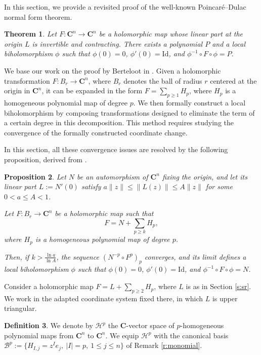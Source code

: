 \documentclass[english,11pt]{amsart}
\newtheorem{theorem}{Theorem}[section]
\newtheorem{proposition}[theorem]{Proposition}
\theoremstyle{definition}
\newtheorem{definition}[theorem]{Definition}
\theoremstyle{remark}
\numberwithin{equation}{section}
\newcommand{\C}{\mathbf{C}}
\begin{document}
In this section, we provide a revisited proof of the well-known Poincar\'e--Dulac normal form theorem.
\begin{theorem}\label{t:PD0}
    Let $F : \C^n \to \C^n$ be a holomorphic map whose linear part at the origin $L$ is invertible and contracting. There exists a polynomial $P$ and a local biholomorphism $\phi$ such that $\phi(0) = 0$, $\phi'(0) = \text{Id}$, and $\phi^{-1} \circ F \circ \phi = P$.
\end{theorem}

We base our work on the proof by Berteloot in \cite{Berteloot}. Given a holomorphic transformation $F : B_r \to \C^n$, where $B_r$ denotes the ball of radius $r$ centered at the origin in $\C^n$, it can be expanded in the form $F = \sum_{p \geq 1} H_p$, where $H_p$ is a homogeneous polynomial map of degree $p$. We then formally construct a local biholomorphism by composing transformations designed to eliminate the term of a certain degree in this decomposition. This method requires studying the convergence of the formally constructed coordinate change.

In this section, all these convergence issues are resolved by the following proposition, derived from \cite{Berteloot}.
\begin{proposition}\label{p:conv}
Let $N$ be an automorphism of $\C^n$ fixing the origin, and let its linear part $L := N'(0)$ satisfy $a \|z\| \leq \|L(z)\| \leq A \|z\|$ for some $0 < a \leq A < 1$.

Let $F : B_r \to \C^n$ be a holomorphic map such that
\[
F = N + \sum_{p \geq k} H_p,
\]
where $H_p$ is a homogeneous polynomial map of degree $p$.

Then, if $k > \frac{\ln a}{\ln A}$, the sequence $(N^{-p} \circ F^p)_p$ converges, and its limit defines a local biholomorphism $\phi$ such that $\phi(0) = 0$, $\phi'(0) = \text{Id}$, and $\phi^{-1} \circ F \circ \phi = N$.
\end{proposition}

Consider a holomorphic map $F = L + \sum_{p \geq 2} H_p$, where $L$ is as in Section \ref{s:sr}. We work in the adapted coordinate system fixed there, in which $L$ is upper triangular.

\begin{definition}
We denote by $\mathcal{H}^p$ the $\C$-vector space of $p$-homogeneous polynomial maps from $\C^n$ to $\C^n$. We equip $\mathcal{H}^p$ with the canonical basis $\mathcal{B}^p := \{H_{I,j} = z^I e_j,\ |I| = p,\ 1 \leq j \leq n\}$ of Remark \ref{r:monomial}.
\end{definition}
\end{document}
